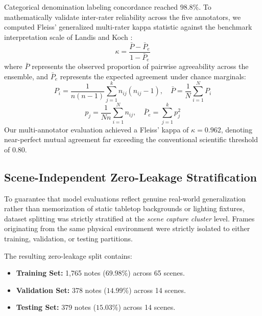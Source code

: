 \documentclass[conference]{IEEEtran}
\begin{document}
Categorical denomination labeling concordance reached \textbf{$98.8\%$}. To mathematically validate inter-rater reliability across the five annotators, we computed Fleiss' generalized multi-rater kappa statistic \cite{fleiss1971measuring} against the benchmark interpretation scale of Landis and Koch \cite{landis1977measurement}:
\begin{equation}
    \kappa = \frac{\bar{P} - \bar{P}_e}{1 - \bar{P}_e}
    \label{eq:fleiss_kappa}
\end{equation}
where $\bar{P}$ represents the observed proportion of pairwise agreeability across the ensemble, and $\bar{P}_e$ represents the expected agreement under chance marginals:
\begin{equation}
    P_i = \frac{1}{n(n-1)} \sum_{j=1}^k n_{ij}(n_{ij} - 1), \quad \bar{P} = \frac{1}{N} \sum_{i=1}^N P_i
\end{equation}
\begin{equation}
    p_j = \frac{1}{N n} \sum_{i=1}^N n_{ij}, \quad \bar{P}_e = \sum_{j=1}^k p_j^2
\end{equation}
Our multi-annotator evaluation achieved a Fleiss' kappa of \textbf{$\kappa = 0.962$}, denoting near-perfect mutual agreement far exceeding the conventional scientific threshold of $0.80$.

\subsection{Scene-Independent Zero-Leakage Stratification}
To guarantee that model evaluations reflect genuine real-world generalization rather than memorization of static tabletop backgrounds or lighting fixtures, dataset splitting was strictly stratified at the \textit{scene capture cluster} level. Frames originating from the same physical environment were strictly isolated to either training, validation, or testing partitions. 

The resulting zero-leakage split contains:
\begin{itemize}
    \item \textbf{Training Set:} 1,765 notes ($69.98\%$) across 65 scenes.
    \item \textbf{Validation Set:} 378 notes ($14.99\%$) across 14 scenes.
    \item \textbf{Testing Set:} 379 notes ($15.03\%$) across 14 scenes.
\end{itemize}

\end{document}
